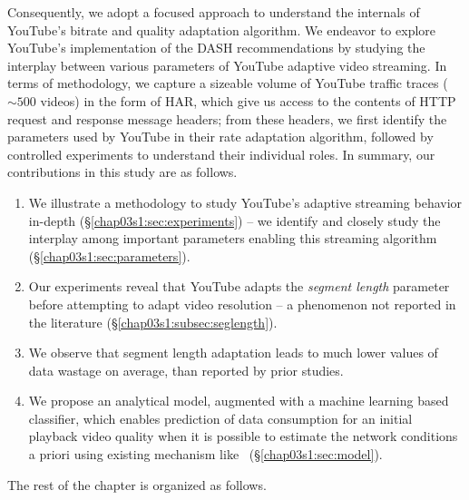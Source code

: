Consequently, we adopt a focused approach to understand the internals of YouTube's bitrate and quality adaptation algorithm.
We endeavor to explore YouTube's implementation of the DASH recommendations by studying the interplay between various parameters of YouTube adaptive video streaming.
In terms of methodology, we capture a sizeable volume of YouTube traffic traces ($\sim500$ videos) in the form of \ac{HAR}, which give us access to the contents of HTTP request and response message headers;
from these headers, we first identify the parameters used by YouTube in their rate adaptation algorithm, followed by controlled experiments to understand their individual roles. In summary, our contributions in this study are as follows.
\begin{enumerate}
	\item We illustrate a methodology to study YouTube's adaptive streaming behavior in-depth (\S\ref{chap03s1:sec:experiments}) -- we identify and closely study the interplay among important parameters enabling this streaming algorithm (\S\ref{chap03s1:sec:parameters}).
	\item Our experiments reveal that YouTube adapts the {\it segment length} parameter before attempting to adapt video resolution -- a phenomenon not reported in the literature (\S\ref{chap03s1:subsec:seglength}).
	\item We observe that segment length adaptation leads to much lower values of data wastage on average, than reported by prior studies.
	\item We propose an analytical model, augmented with a machine learning based classifier, which enables prediction of data consumption for an initial playback video quality when it is possible to estimate the network conditions a priori using existing mechanism like~\cite{Zou2015}  (\S\ref{chap03s1:sec:model}).
\end{enumerate}

The rest of the chapter is organized as follows.  


